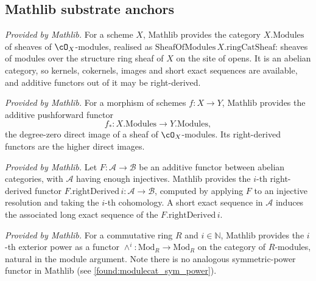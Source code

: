 \subsection{Mathlib substrate anchors}

\begin{definition}
  \label{mathlib:oxmod_category}
  \mathlibok
  \textit{Provided by Mathlib.}
  For a scheme \(X\), Mathlib provides the category \(X.\mathrm{Modules}\) of
  sheaves of \(\cO_X\)-modules, realised as \(\mathrm{SheafOfModules}\,
  X.\mathrm{ringCatSheaf}\): sheaves of modules over the structure ring sheaf of
  \(X\) on the site of opens.  It is an abelian category, so kernels, cokernels,
  images and short exact sequences are available, and additive functors out of
  it may be right-derived.
\end{definition}

\begin{definition}
  \label{mathlib:oxmod_pushforward}
  \mathlibok
  \textit{Provided by Mathlib.}
  For a morphism of schemes \(f:X\to Y\), Mathlib provides the additive
  pushforward functor
  \[
    f_*:X.\mathrm{Modules}\to Y.\mathrm{Modules},
  \]
  the degree-zero direct image of a sheaf of \(\cO_X\)-modules.  Its
  right-derived functors are the higher direct images.
\end{definition}

\begin{definition}
  \label{mathlib:right_derived}
  \mathlibok
  \textit{Provided by Mathlib.}
  Let \(F:\mathcal A\to\mathcal B\) be an additive functor between abelian
  categories, with \(\mathcal A\) having enough injectives.  Mathlib provides the
  \(i\)-th right-derived functor \(F.\mathrm{rightDerived}\,i:\mathcal A\to
  \mathcal B\), computed by applying \(F\) to an injective resolution and taking
  the \(i\)-th cohomology.  A short exact sequence in \(\mathcal A\) induces the
  associated long exact sequence of the \(F.\mathrm{rightDerived}\,i\).
\end{definition}

\begin{definition}
  \label{mathlib:exterior_power_functor}
  \mathlibok
  \textit{Provided by Mathlib.}
  For a commutative ring \(R\) and \(i\in\mathbb N\), Mathlib provides the
  \(i\)-th exterior power as a functor
  \(\wedge^i:\mathrm{Mod}_R\to\mathrm{Mod}_R\) on the category of \(R\)-modules,
  natural in the module argument.  Note there is no analogous symmetric-power
  functor in Mathlib (see \cref{found:modulecat_sym_power}).
\end{definition}

